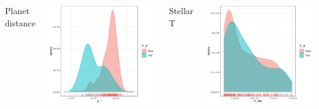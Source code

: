 \documentclass[compress]{beamer}
\begin{document}
\begin{frame}
\begin{columns}[t]
        \begin{center}
        Planet distance\\
        \end{center}
        \includegraphics[width=\linewidth]{Pic/Density/S_T.pdf}
        \begin{center}
        Stellar T \\
        \end{center}
        \includegraphics[width=\linewidth]{Pic/Density/P_PN.pdf}

\end{columns}
\end{frame}
\end{document}
